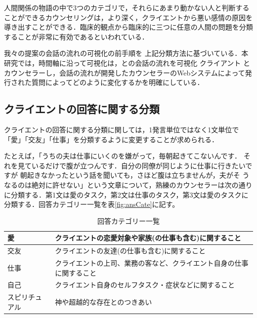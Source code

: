 \documentclass[shuuron]{kuee}
\begin{document}

人間関係の物語の中で3つのカテゴリで，それらにあまり動かない人と判断することができるカウンセリングは，より深く，クライエントから悪い感情の原因を導き出すことができる．臨床的観点から臨床的に三つに任意の人間の問題を分類することが非常に有効であるといわれている．

我々の提案の会話の流れの可視化の前手順を 上記分類方法に基づいている．本研究では，時間軸に沿って可視化は，との会話の流れを可視化 クライアント とカウンセラーし，会話の流れが開発したカウンセラーのWebシステムによって発行された質問によってどのように変化するかを明確にしている．


\subsection{クライエントの回答に関する分類}



クライエントの回答に関する分類に関しては，1発言単位ではなく1文単位で「愛」「交友」「仕事」を分類するように変更することが求められる．

たとえば，「うちの夫は仕事にいくのを嫌がって，毎朝起きてこないんです．
それを見ているだけで腹が立つんです．自分の同僚が同じように仕事に行きたいですが
朝起きなかったという話を聞いても，さほど腹は立ちませんが，夫がそ
うなるのは絶対に許せない」という文章について，熟練のカウンセラーは次の通りに分類する．第1文は愛のタスク，第2文は仕事のタスク，第3文は愛のタスクに分類する．回答カテゴリー一覧を表\ref{fig:ansCate}に記す。

\begin{table}
  \caption{回答カテゴリー一覧}
  \label{table:ansCate}
  \begin{center}
    \begin{tabular}{|l|p{7cm}|} \hline
      愛 & クライエントの恋愛対象や家族(の仕事も含む)に関すること

      \\ \hline
      交友  & クライエントの友達(の仕事も含む)に関すること

      \\ \hline
      仕事 & クライエントの上司、業務の客など、クライエント自身の仕事に関すること

      \\ \hline
      自己  &  クライエント自身のセルフタスク・症状などに関すること
      \\ \hline
      スピリチュアル & 神や超越的な存在とのつきあい
      \\ \hline
    \end{tabular}
  \end{center}
\end{table}
\end{document}
